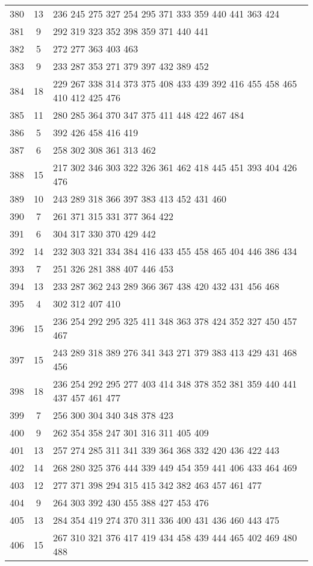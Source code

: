 \documentclass{standalone}
\begin{document}
\begin{tabular}{c c l}
380 & 13 & 236 245 275 327 254 295 371 333 359 440 441 363 424 \\
381 & 9 & 292 319 323 352 398 359 371 440 441 \\
382 & 5 & 272 277 363 403 463 \\
383 & 9 & 233 287 353 271 379 397 432 389 452 \\
384 & 18 & 229 267 338 314 373 375 408 433 439 392 416 455 458 465 410 412 425 476 \\
385 & 11 & 280 285 364 370 347 375 411 448 422 467 484 \\
386 & 5 & 392 426 458 416 419 \\
387 & 6 & 258 302 308 361 313 462 \\
388 & 15 & 217 302 346 303 322 326 361 462 418 445 451 393 404 426 476 \\
389 & 10 & 243 289 318 366 397 383 413 452 431 460 \\
390 & 7 & 261 371 315 331 377 364 422 \\
391 & 6 & 304 317 330 370 429 442 \\
392 & 14 & 232 303 321 334 384 416 433 455 458 465 404 446 386 434 \\
393 & 7 & 251 326 281 388 407 446 453 \\
394 & 13 & 233 287 362 243 289 366 367 438 420 432 431 456 468 \\
395 & 4 & 302 312 407 410 \\
396 & 15 & 236 254 292 295 325 411 348 363 378 424 352 327 450 457 467 \\
397 & 15 & 243 289 318 389 276 341 343 271 379 383 413 429 431 468 456 \\
398 & 18 & 236 254 292 295 277 403 414 348 378 352 381 359 440 441 437 457 461 477 \\
399 & 7 & 256 300 304 340 348 378 423 \\
400 & 9 & 262 354 358 247 301 316 311 405 409 \\
401 & 13 & 257 274 285 311 341 339 364 368 332 420 436 422 443 \\
402 & 14 & 268 280 325 376 444 339 449 454 359 441 406 433 464 469 \\
403 & 12 & 277 371 398 294 315 415 342 382 463 457 461 477 \\
404 & 9 & 264 303 392 430 455 388 427 453 476 \\
405 & 13 & 284 354 419 274 370 311 336 400 431 436 460 443 475 \\
406 & 15 & 267 310 321 376 417 419 434 458 439 444 465 402 469 480 488 \\

\end{tabular}
\end{document}
